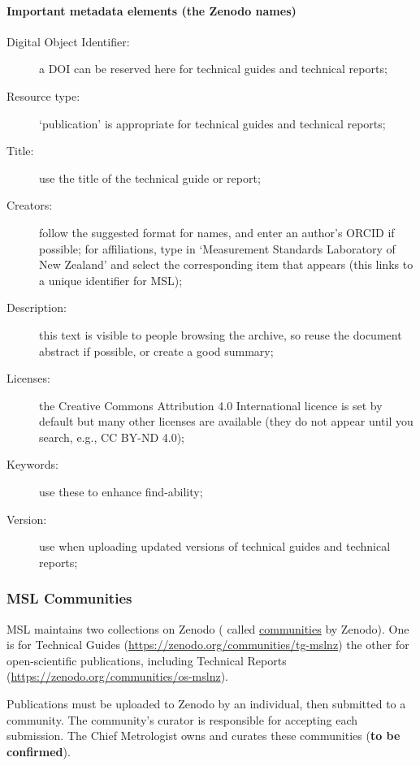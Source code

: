{\paragraph{Important metadata elements (the Zenodo names)}
\begin{description}
    \item[Digital Object Identifier:] a DOI can be reserved here for technical guides and technical reports;
    \item[Resource type:] `publication' is appropriate for technical guides and technical reports;
    \item[Title:] use the title of the technical guide or report;
    \item[Creators:] follow the suggested format for names, and enter an author's ORCID if possible; for affiliations, type in `Measurement Standards Laboratory of New Zealand' and select the corresponding item that appears (this links to a unique identifier for MSL);
    \item[Description:] this text is visible to people browsing the archive, so reuse the document abstract if possible, or create a good summary;
    \item[Licenses:] the Creative Commons Attribution 4.0 International licence is set by default but many other licenses are available (they do not appear until you search, e.g., CC BY-ND 4.0); 
    \item[Keywords:] use these to enhance find-ability;
    \item[Version:] use when uploading updated versions of technical guides and technical reports;
\end{description}


\subsubsection{MSL Communities} MSL maintains two collections on Zenodo ( called \href{https://help.zenodo.org/docs/communities/about-communities/}{communities} by Zenodo). One is for Technical Guides (\url{https://zenodo.org/communities/tg-mslnz}) the other for open-scientific publications, including Technical Reports (\url{https://zenodo.org/communities/os-mslnz}).

Publications must be uploaded to Zenodo by an individual, then submitted to a community. The community's curator is responsible for accepting each submission. The Chief Metrologist owns and curates these communities (\textbf{to be confirmed}).

}
